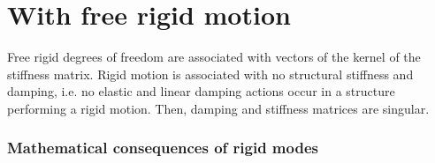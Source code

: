 \documentclass[letterpaper,10pt,english]{jupyterBook}
\begin{document}
\section{With free rigid motion}
\label{\detokenize{ch/solids/small-displacements-numerics:with-free-rigid-motion}}\label{\detokenize{ch/solids/small-displacements-numerics:solid-mechanics-intro-small-displacements-numerics-rigid}}
\sphinxAtStartPar
Free rigid degrees of freedom are associated with vectors of the kernel of the stiffness matrix. Rigid motion is associated with no structural stiffness and damping, i.e. no elastic and linear damping actions occur in a structure performing a rigid motion. Then, damping and stiffness matrices are singular.
\subsubsection*{Mathematical consequences of rigid modes}
\end{document}
